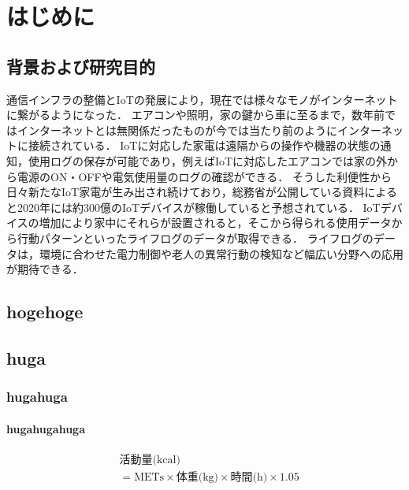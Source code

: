 \chapter{はじめに}
\thispagestyle{myheadings}

\section{背景および研究目的}

通信インフラの整備とIoTの発展により，現在では様々なモノがインターネットに繋がるようになった．
エアコンや照明，家の鍵から車に至るまで，数年前ではインターネットとは無関係だったものが今では当たり前のようにインターネットに接続されている．
IoTに対応した家電は遠隔からの操作や機器の状態の通知，使用ログの保存が可能であり，例えばIoTに対応したエアコンでは家の外から電源のON・OFFや電気使用量のログの確認ができる．
そうした利便性から日々新たなIoT家電が生み出され続けており，総務省が公開している資料\cite{soumusyo}によると2020年には約300億のIoTデバイスが稼働していると予想されている．
IoTデバイスの増加により家中にそれらが設置されると，そこから得られる使用データから行動パターンといったライフログのデータが取得できる．
ライフログのデータは，環境に合わせた電力制御や老人の異常行動の検知など幅広い分野への応用が期待できる．


\section{hogehoge}

\section{huga}
\subsection{hugahuga}
\subsubsection{hugahugahuga}


\begin{equation}
  \begin{split}
      &\mbox{活動量(kcal)} \\
      &= \mbox{METs} \times \mbox{体重(kg)} \times \mbox{時間(h)} \times 1.05 \label{CalFormula}
  \end{split}
\end{equation}

